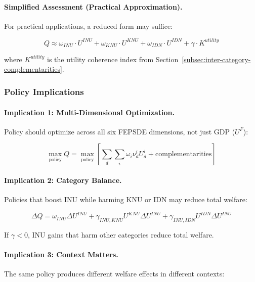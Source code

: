 \paragraph{Simplified Assessment (Practical Approximation).}
For practical applications, a reduced form may suffice:

\begin{equation}
Q \approx \omega_{INU} \cdot U^{INU} + \omega_{KNU} \cdot U^{KNU} + \omega_{IDN} \cdot U^{IDN} + \gamma \cdot K^{utility}
\end{equation}

where $K^{utility}$ is the utility coherence index from Section~\ref{subsec:inter-category-complementarities}.

\subsubsection{Policy Implications}

\paragraph{Implication 1: Multi-Dimensional Optimization.}
Policy should optimize across all six FEPSDE dimensions, not just GDP ($U^F$):

\begin{equation}
\max_{\text{policy}} Q = \max_{\text{policy}} \left[ \sum_d \sum_i \omega_i \nu^i_d U^i_d + \text{complementarities} \right]
\end{equation}

\paragraph{Implication 2: Category Balance.}
Policies that boost INU while harming KNU or IDN may reduce total welfare:

\begin{equation}
\Delta Q = \omega_{INU} \Delta U^{INU} + \gamma_{INU,KNU} U^{KNU} \Delta U^{INU} + \gamma_{INU,IDN} U^{IDN} \Delta U^{INU}
\end{equation}

If $\gamma < 0$, INU gains that harm other categories reduce total welfare.

\paragraph{Implication 3: Context Matters.}
The same policy produces different welfare effects in different contexts:

